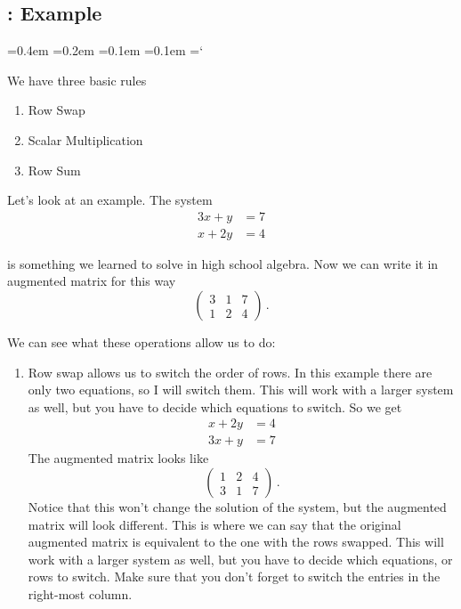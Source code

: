 
\subsection{\elemRowOpsTitle: Example}

{\ttfamily
{}\font=0.4em
\font=0.2em
\font=0.1em
\font=0.1em
\hyphenchar\font=`\-


\hypertarget{script_elementary_row_operations_example}{We have three basic rules} 
\begin{enumerate}
\item Row Swap
\item Scalar Multiplication
\item Row Sum
\end{enumerate}

Let's look at an example. The system 
\begin{align*}
 3x + y & = 7\\
 x + 2y & = 4
\end{align*}

is something we learned to solve in high school algebra. Now we can write it in augmented matrix for this way
\[
\left( \begin{array}{cc|c}
3 & 1 & 7 \\
1 & 2 & 4  
\end{array} \right)\, .
\]

We can see what these operations allow us to do:
\begin{enumerate}
\item Row swap allows us to switch the order of rows. In this example there are only two equations, so I will switch them. This will work with a larger system as well, but you have to decide which equations to switch. So we get
\begin{align*}
 x + 2y &= 4 \\
3x + y &= 7
\end{align*}
The augmented matrix looks like 
\[
\left( \begin{array}{cc|c}
1 & 2 & 4 \\
3 & 1 & 7
\end{array} \right)\, .
\]
Notice that this won't change the solution of the system, but the augmented matrix will look different. This is where we can say that the original augmented matrix is equivalent to the one with the rows swapped.
This will work with a larger system as well, but you have to decide which equations, or rows to switch. Make sure that you don't forget to switch the entries in the right-most column.


\end{enumerate}}

